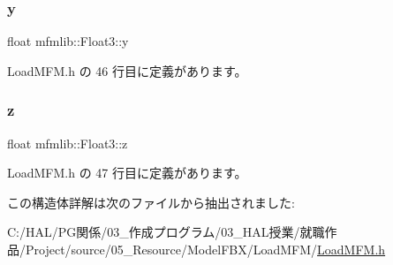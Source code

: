 \subsubsection{\texorpdfstring{y}{y}}
{\footnotesize\ttfamily float mfmlib\+::\+Float3\+::y}



 Load\+M\+F\+M.\+h の 46 行目に定義があります。

\mbox{\label{structmfmlib_1_1_float3_a9ade46ae48697f268fc476c753c5db59}} 
\subsubsection{\texorpdfstring{z}{z}}
{\footnotesize\ttfamily float mfmlib\+::\+Float3\+::z}



 Load\+M\+F\+M.\+h の 47 行目に定義があります。



この構造体詳解は次のファイルから抽出されました\+:\begin{DoxyCompactItemize}
\item 
C\+:/\+H\+A\+L/\+P\+G関係/03\+\_\+作成プログラム/03\+\_\+\+H\+A\+L授業/就職作品/\+Project/source/05\+\_\+\+Resource/\+Model\+F\+B\+X/\+Load\+M\+F\+M/\mbox{\hyperlink{_load_m_f_m_8h}{Load\+M\+F\+M.\+h}}\end{DoxyCompactItemize}

